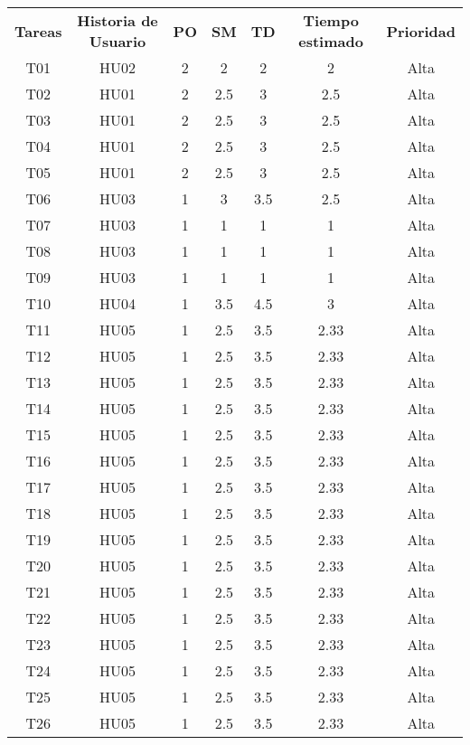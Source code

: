 \begin{table}[H]
	\begin{center}
		\begin{longtable}{| c | c | c | c | c | c | c |}
			\hline

			\textbf{Tareas} &\textbf{Historia de Usuario} & \textbf{PO} & \textbf{SM} & \textbf{TD} & \textbf{Tiempo estimado} & \textbf{Prioridad} \\
			T01 & HU02 & 2 & 2 & 2 & 2 & Alta \\
			T02 & HU01 & 2 & 2.5 & 3 & 2.5 & Alta \\
			T03 & HU01 & 2 & 2.5 & 3 & 2.5 & Alta \\
			T04 & HU01 & 2 & 2.5 & 3 & 2.5 & Alta \\
			T05 & HU01 & 2 & 2.5 & 3 & 2.5 & Alta \\
			T06 & HU03 & 1 & 3 & 3.5 & 2.5 & Alta \\
			T07 & HU03 & 1 & 1 & 1 & 1 & Alta \\
			T08 & HU03 & 1 & 1 & 1 & 1 & Alta \\
			T09 & HU03 & 1 & 1 & 1 & 1 & Alta \\
			T10 & HU04 & 1 & 3.5 & 4.5 & 3 & Alta \\
			T11 & HU05 & 1 & 2.5 & 3.5 & 2.33 & Alta \\
			T12 & HU05 & 1 & 2.5 & 3.5 & 2.33 & Alta \\
			T13 & HU05 & 1 & 2.5 & 3.5 & 2.33 & Alta \\
			T14 & HU05 & 1 & 2.5 & 3.5 & 2.33 & Alta \\
			T15 & HU05 & 1 & 2.5 & 3.5 & 2.33 & Alta \\
			T16 & HU05 & 1 & 2.5 & 3.5 & 2.33 & Alta \\
			T17 & HU05 & 1 & 2.5 & 3.5 & 2.33 & Alta \\
			T18 & HU05 & 1 & 2.5 & 3.5 & 2.33 & Alta \\
			T19 & HU05 & 1 & 2.5 & 3.5 & 2.33 & Alta \\
			T20 & HU05 & 1 & 2.5 & 3.5 & 2.33 & Alta \\
			T21 & HU05 & 1 & 2.5 & 3.5 & 2.33 & Alta \\
			T22 & HU05 & 1 & 2.5 & 3.5 & 2.33 & Alta \\
			T23 & HU05 & 1 & 2.5 & 3.5 & 2.33 & Alta \\
			T24 & HU05 & 1 & 2.5 & 3.5 & 2.33 & Alta \\
			T25 & HU05 & 1 & 2.5 & 3.5 & 2.33 & Alta \\
			T26 & HU05 & 1 & 2.5 & 3.5 & 2.33 & Alta \\

\end{longtable}
\end{center}
\end{table}
